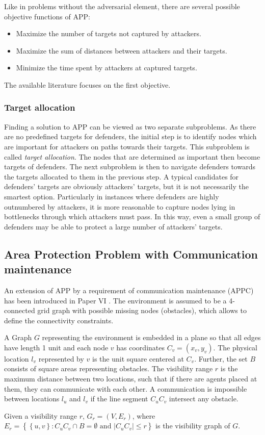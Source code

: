 Like in problems without the adversarial element, there are several possible objective functions of APP:
\begin{itemize}
        \item Maximize the number of targets not captured by attackers.
        \item Maximize the sum of distances between attackers and their targets.
        \item Minimize the time spent by attackers at captured targets.
\end{itemize}
The available literature focuses on the first objective.

\subsubsection{Target allocation}\label{sec:appta}

Finding a solution to APP can be viewed as two separate subproblems.
As there are no predefined targets for defenders, the initial step is to identify nodes which are important  for attackers on paths towards their targets.
This subproblem is called \emph{target allocation}.
The nodes that are determined as important then become targets of defenders.
The next subproblem is then to navigate defenders towards the targets allocated to them in the previous step.
A typical candidates for defenders' targets are obviously attackers' targets, but it is not necessarily the smartest option.
Particularly in instances where defenders are highly outnumbered by attackers, it is more reasonable to capture nodes lying in bottlenecks through which attackers must pass.
In this way, even a small group of defenders may be able to protect a large number of attackers' targets.

\subsection{Area Protection Problem with Communication maintenance}

An extension of APP by a requirement of communication maintenance (APPC) has been introduced in Paper VI \cite{ivanova18b}.
The environment is assumed to be a 4-connected grid graph with possible missing nodes (obstacles), which allows to define the connectivity constraints.

A Graph $G$ representing the environment is embedded in a plane so that all edges have length 1 unit and each node $v$ has coordinates $C_v=(x_v,y_v)$.
The physical location $l_v$ represented by $v$ is the unit square centered at $C_v$.
Further, the set $B$ consists of square areas representing obstacles.
The visibility range $r$ is the maximum distance between two locations, such that if there are agents placed at them, they can communicate with each other.
A communication is impossible between locations $l_u$ and $l_v$ if the line segment $C_uC_v$ intersect any obstacle. 
\begin{definition}
	Given a visibility range $r$, $G_r=(V,E_r)$, where \newline
	$E_r=\left\{\left\{u,v\right\}:C_uC_v\cap B=\emptyset\text{ and } |C_uC_v|\leq r\right\}$ is the visibility graph of $G$.
\end{definition}

